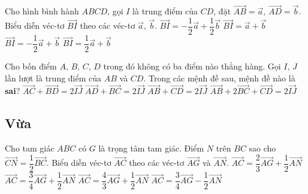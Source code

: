 \begin{ex}%
	Cho hình bình hành $ABCD$, gọi $I$ là trung điểm của $CD$, đặt $\vec{AB}=\vec{a},\,\vec{AD}=\vec{b}$. Biểu diễn véc-tơ $\vec{BI}$ theo các véc-tơ $\vec{a},\,\vec{b}$.
	\choice
	{$\vec{BI}=-\dfrac{1}{2}\vec{a}+\dfrac{1}{2}\vec{b}$}
	{$\vec{BI}=\vec{a}+\vec{b}$}
	{\True $\vec{BI}=-\dfrac{1}{2}\vec{a}+\vec{b}$}
	{$\vec{BI}=\dfrac{1}{2}\vec{a}+\vec{b}$}
\end{ex}

\begin{ex}%
	Cho bốn điểm $A,\,B,\,C,\,D$ trong đó không có ba điểm nào thẳng hàng. Gọi $I,\,J$ lần lượt là trung điểm của $AB$ và $CD$. Trong các mệnh đề sau, mệnh đề nào là \textbf{sai}?
	\choice
	{$\vec{AC}+\vec{BD}=2\vec{IJ}$}
	{$\vec{AD}+\vec{BC}=2\vec{IJ}$}
	{\True $\vec{AB}+\vec{CD}=2\vec{IJ}$}
	{$\vec{AB}+2\vec{BC}+\vec{CD}=2\vec{IJ}$}
\end{ex}

\subsection*{Vừa}
\begin{ex}%
	Cho tam giác $ABC$ có $G$ là trọng tâm tam giác. Điểm $N$ trên $BC$ sao cho $\vec{CN}=\dfrac{1}{2}\vec{BC}$. Biểu diễn véc-tơ $\vec{AC}$ theo các véc-tơ $\vec{AG}$ và $\vec{AN}$.
	\choice
	{$\vec{AC}=\dfrac{2}{3}\vec{AG}+\dfrac{1}{2}\vec{AN}$}
	{\True $\vec{AC}=\dfrac{3}{4}\vec{AG}+\dfrac{1}{2}\vec{AN}$}
	{$\vec{AC}=\dfrac{4}{3}\vec{AG}+\dfrac{1}{2}\vec{AN}$}
	{$\vec{AC}=\dfrac{3}{4}\vec{AG}-\dfrac{1}{2}\vec{AN}$}
\end{ex}

